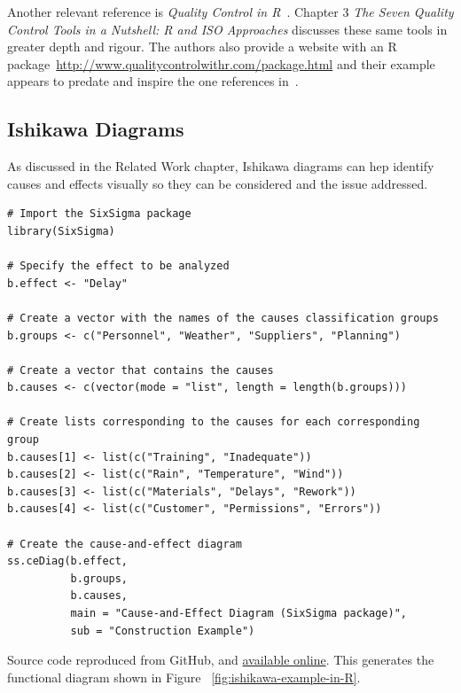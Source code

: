 Another relevant reference is \emph{Quality Control in R}~\cite{quality_control_in_R_book}. Chapter 3 \emph{The Seven Quality Control Tools in a Nutshell: R and ISO Approaches} discusses these same tools in greater depth and rigour. The authors also provide a website with an R package~\url{http://www.qualitycontrolwithr.com/package.html} and their example appears to predate and inspire the one references in~\cite{7_basic_quality_tools_with_R}.

\subsection{Ishikawa Diagrams}
As discussed in the Related Work chapter, Ishikawa diagrams can hep identify causes and effects visually so they can be considered and the issue addressed.

\begin{lstlisting}
# Import the SixSigma package
library(SixSigma)

# Specify the effect to be analyzed
b.effect <- "Delay"

# Create a vector with the names of the causes classification groups
b.groups <- c("Personnel", "Weather", "Suppliers", "Planning")

# Create a vector that contains the causes
b.causes <- c(vector(mode = "list", length = length(b.groups)))

# Create lists corresponding to the causes for each corresponding group
b.causes[1] <- list(c("Training", "Inadequate"))
b.causes[2] <- list(c("Rain", "Temperature", "Wind"))
b.causes[3] <- list(c("Materials", "Delays", "Rework"))
b.causes[4] <- list(c("Customer", "Permissions", "Errors"))

# Create the cause-and-effect diagram
ss.ceDiag(b.effect,
          b.groups,
          b.causes,
          main = "Cause-and-Effect Diagram (SixSigma package)",
          sub = "Construction Example")
\end{lstlisting}
Source code reproduced from GitHub, and \href{https://gist.github.com/rsalaza4/eff4a0a7e8e4894e4b82152fcf66e847/raw/cfbfe93c784989ee8fd6b686dd26fb88f4cec26d/Cause-and-effect\%20diagram.R}{available online}. This generates the functional diagram shown in Figure ~\ref{fig:ishikawa-example-in-R}.

